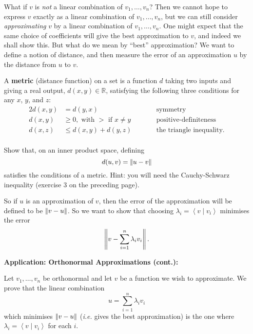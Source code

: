\documentclass{article}
\newcommand{\norm}[1]{\left|\kern-1pt\left|#1\right|\kern-1pt\right|}
\newcommand{\braket}[2]{\left\langle #1 \mid #2 \right\rangle}
\begin{document}
What if $v$ is \textit{not} a linear combination of $v_1,\hdots,v_n$? Then we cannot hope to express $v$ exactly as a linear combination of $v_1,\hdots,v_n$, but we can still consider \textit{approximating} $v$ by a linear combination of $v_1,\hdots,v_n$. One might expect that the same choice of coefficients will give the best approximation to $v$, and indeed we shall show this. But what do we mean by ``best'' approximation? We want to define a notion of distance, and then measure the error of an approximation $u$ by the distance from $u$ to $v$.

A \textbf{metric} (distance function) on a set is a function $d$ taking two inputs and giving a real output, $d(x,y)\in\mathbb{R}$, satisfying the following three conditions for any $x$, $y$, and $z$:
\begin{alignat*}{2}
	d(x,y) &= d(y,x)\qquad&& \mbox{symmetry}\\
	d(x,y) &\geq 0,\mbox{ with $>$ if $x\neq y$}\qquad&& \mbox{positive-definiteness}\\
	d(x,z) &\leq d(x,y) + d(y,z)\qquad&& \mbox{the triangle inequality.}\\
\end{alignat*}

Show that, on an inner product space, defining
\[d(u,v)=\norm{u-v}\]
satisfies the conditions of a metric. Hint: you will need the Cauchy-Schwarz inequality (exercise 3 on the preceding page).

So if $u$ is an approximation of $v$, then the error of the approximation will be defined to be $\norm{v-u}$. So we want to show that choosing $\lambda_i=\braket{v}{v_i}$ minimises the error
\[\norm{v-\sum_{i=1}^n \lambda_i v_i}.\]




 
\clearpage
 
 
 
\textbf{Application: Orthonormal Approximations (cont.):}\bigskip
 
 Let $v_1,\hdots,v_n$ be orthonormal and let $v$ be a function we wish to approximate. We prove that the linear combination
 \[u=\sum_{i=1}^n \lambda_i v_i\]
 which minimises $\norm{v-u}$ (\textit{i.e.} gives the best approximation) is the one where $\lambda_i=\braket{v}{v_i}$ for each $i$.
 
 
 
 
 
 
 
\end{document}
